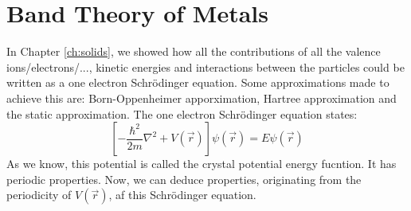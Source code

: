 \chapter{Band Theory of Metals}
In Chapter \ref{ch:solids}, we showed how all the contributions of all the valence ions/electrons/..., kinetic energies and interactions between the particles could be written as a one electron Schrödinger equation. Some approximations made to achieve this are: Born-Oppenheimer apporximation, Hartree approximation and the static approximation.
The one electron Schrödinger equation states:
\begin{equation}
	\left[-\frac{\hbar^2}{2m}\nabla^2 + V(\vec{r})\right]\psi(\vec{r}) = E\psi(\vec{r}) \label{eqn:schrodinger_tbu}
\end{equation}
As we know, this potential is called the crystal potential energy fucntion. It has periodic properties. Now, we can deduce properties, originating from the periodicity of $V(\vec{r})$, af this Schrödinger equation.

